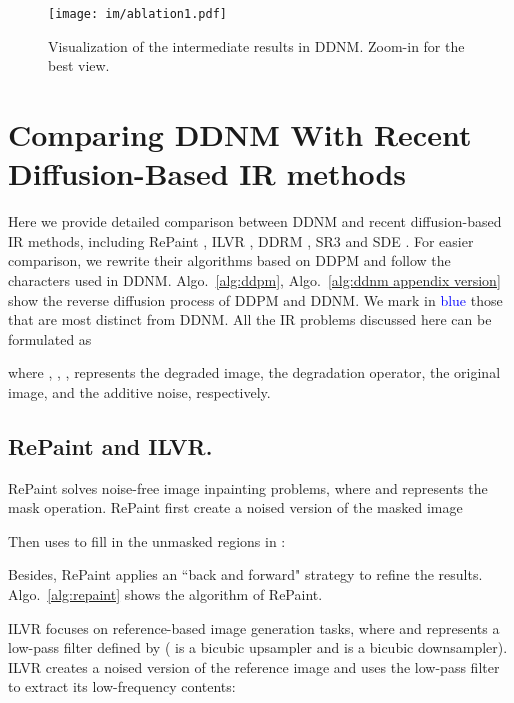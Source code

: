 \documentclass{article} \usepackage{iclr2023_conference,times}
\begin{document}
\begin{figure*}[ht]
  \centering
   \vspace{-0.2cm}
  \texttt{[image: im/ablation1.pdf]}
   \vspace{-0.5cm}
  \caption{Visualization of the intermediate results in DDNM. Zoom-in for the best view.}
   \vspace{-0.8cm}
\label{fig:intermediate} 
\end{figure*}


\newpage


\newpage

\section{Comparing DDNM With Recent Diffusion-Based IR methods}
\label{ap:special cases}
Here we provide detailed comparison between DDNM and recent diffusion-based IR methods, including RePaint \citep{lugmayr2022repaint}, ILVR \citep{choi2021ilvr}, DDRM \citep{kawar2022denoising}, SR3 \citep{sr3} and SDE \citep{song2020score}. For easier comparison, we rewrite their algorithms based on DDPM \citep{ho2020denoising} and follow the characters used in DDNM. Algo.~\ref{alg:ddpm}, Algo.~\ref{alg:ddnm appendix version} show the reverse diffusion process of DDPM and DDNM. We mark in \textcolor{blue}{blue} those that are most distinct from DDNM.
All the IR problems discussed here can be formulated as

where , , ,  represents the degraded image, the degradation operator, the original image, and the additive noise, respectively.

\subsection{RePaint and ILVR.}
RePaint \citep{lugmayr2022repaint} solves noise-free image inpainting problems, where  and  represents the mask operation. RePaint first create a noised version of the masked image 

Then uses  to fill in the unmasked regions in :

Besides, RePaint applies an ``back and forward" strategy to refine the results. Algo.~\ref{alg:repaint} shows the algorithm of RePaint.

ILVR \citep{choi2021ilvr} focuses on reference-based image generation tasks, where  and  represents a low-pass filter defined by  ( is a bicubic upsampler and  is a bicubic downsampler). ILVR creates a noised version of the reference image  and uses the low-pass filter  to extract its low-frequency contents:
\end{document}
